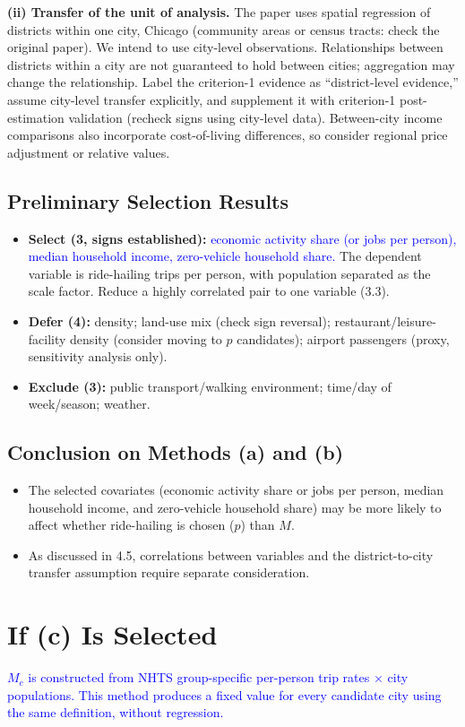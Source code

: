 \documentclass[10pt,a4paper]{article}
\begin{document}
\begin{mdframed}[linecolor=red,linewidth=0.6pt,innerleftmargin=8pt,innerrightmargin=8pt]
\textbf{(ii) Transfer of the unit of analysis.} The paper uses spatial regression of districts within one city, Chicago (community areas or census tracts: check the original paper). We intend to use city-level observations. Relationships between districts within a city are not guaranteed to hold between cities; aggregation may change the relationship. Label the criterion-1 evidence as ``district-level evidence,'' assume city-level transfer explicitly, and supplement it with criterion-1 post-estimation validation (recheck signs using city-level data). Between-city income comparisons also incorporate cost-of-living differences, so consider regional price adjustment or relative values.
\subsection{Preliminary Selection Results}
\begin{itemize}
\item \textbf{Select (3, signs established):} \textcolor{blue}{economic activity share (or jobs per person), median household income, zero-vehicle household share.} The dependent variable is ride-hailing trips per person, with population separated as the scale factor. Reduce a highly correlated pair to one variable (3.3).
\item \textbf{Defer (4):} density; land-use mix (check sign reversal); restaurant/leisure-facility density (consider moving to $p$ candidates); airport passengers (proxy, sensitivity analysis only).
\item \textbf{Exclude (3):} public transport/walking environment; time/day of week/season; weather.
\end{itemize}
\subsection{Conclusion on Methods (a) and (b)}
\begin{itemize}
\item The selected covariates (economic activity share or jobs per person, median household income, and zero-vehicle household share) may be more likely to affect whether ride-hailing is chosen ($p$) than $M$.
\item As discussed in 4.5, correlations between variables and the district-to-city transfer assumption require separate consideration.
\end{itemize}
\end{mdframed}

\section{If (c) Is Selected}
\textcolor{blue}{$M_c$ is constructed from NHTS group-specific per-person trip rates $\times$ city populations. This method produces a fixed value for every candidate city using the same definition, without regression.}
\end{document}
